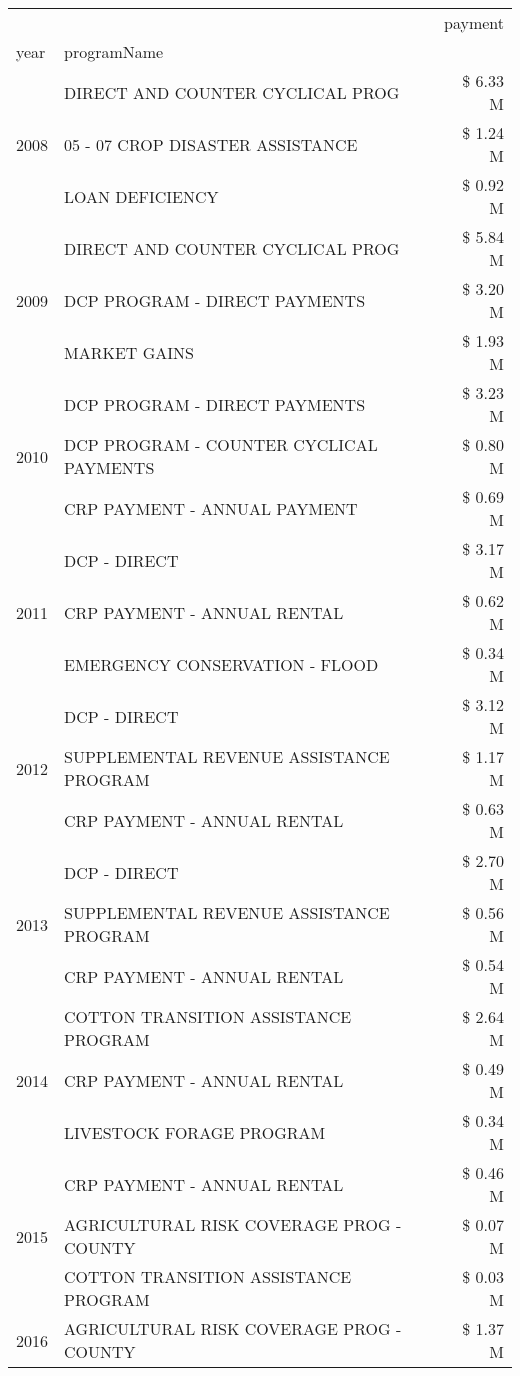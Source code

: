 \begin{tabular}{llr}
\toprule
 &  & payment \\
year & programName &  \\
\midrule
\multirow[t]{3}{*}{2008} & DIRECT AND COUNTER CYCLICAL PROG & \$ 6.33 M \\
 & 05 - 07 CROP DISASTER ASSISTANCE & \$ 1.24 M \\
 & LOAN DEFICIENCY & \$ 0.92 M \\
\cline{1-3}
\multirow[t]{3}{*}{2009} & DIRECT AND COUNTER CYCLICAL PROG & \$ 5.84 M \\
 & DCP PROGRAM - DIRECT PAYMENTS & \$ 3.20 M \\
 & MARKET GAINS & \$ 1.93 M \\
\cline{1-3}
\multirow[t]{3}{*}{2010} & DCP PROGRAM - DIRECT PAYMENTS & \$ 3.23 M \\
 & DCP PROGRAM - COUNTER CYCLICAL PAYMENTS & \$ 0.80 M \\
 & CRP PAYMENT - ANNUAL PAYMENT & \$ 0.69 M \\
\cline{1-3}
\multirow[t]{3}{*}{2011} & DCP - DIRECT & \$ 3.17 M \\
 & CRP PAYMENT - ANNUAL RENTAL & \$ 0.62 M \\
 & EMERGENCY CONSERVATION - FLOOD & \$ 0.34 M \\
\cline{1-3}
\multirow[t]{3}{*}{2012} & DCP - DIRECT & \$ 3.12 M \\
 & SUPPLEMENTAL REVENUE ASSISTANCE PROGRAM & \$ 1.17 M \\
 & CRP PAYMENT - ANNUAL RENTAL & \$ 0.63 M \\
\cline{1-3}
\multirow[t]{3}{*}{2013} & DCP - DIRECT & \$ 2.70 M \\
 & SUPPLEMENTAL REVENUE ASSISTANCE PROGRAM & \$ 0.56 M \\
 & CRP PAYMENT - ANNUAL RENTAL & \$ 0.54 M \\
\cline{1-3}
\multirow[t]{3}{*}{2014} & COTTON TRANSITION ASSISTANCE PROGRAM & \$ 2.64 M \\
 & CRP PAYMENT - ANNUAL RENTAL & \$ 0.49 M \\
 & LIVESTOCK FORAGE PROGRAM & \$ 0.34 M \\
\cline{1-3}
\multirow[t]{3}{*}{2015} & CRP PAYMENT - ANNUAL RENTAL & \$ 0.46 M \\
 & AGRICULTURAL RISK COVERAGE PROG - COUNTY & \$ 0.07 M \\
 & COTTON TRANSITION ASSISTANCE PROGRAM & \$ 0.03 M \\
\cline{1-3}
\multirow[t]{3}{*}{2016} & AGRICULTURAL RISK COVERAGE PROG - COUNTY & \$ 1.37 M \\

\end{tabular}
